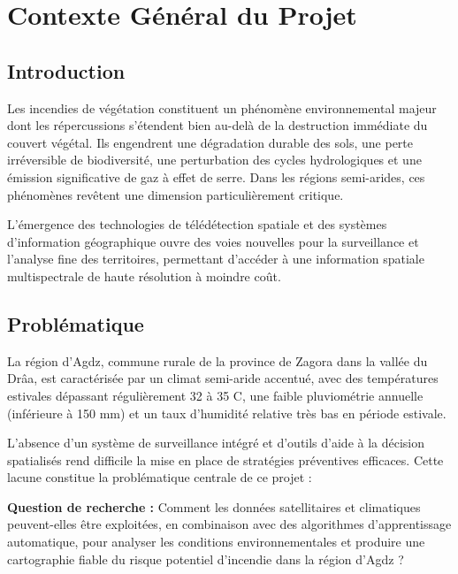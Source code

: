 \documentclass[12pt,a4paper]{report}
\begin{document}
\section{Contexte Général du Projet}

\subsection{Introduction}

Les incendies de végétation constituent un phénomène environnemental majeur dont les répercussions s'étendent bien au-delà de la destruction immédiate du couvert végétal. Ils engendrent une dégradation durable des sols, une perte irréversible de biodiversité, une perturbation des cycles hydrologiques et une émission significative de gaz à effet de serre. Dans les régions semi-arides, ces phénomènes revêtent une dimension particulièrement critique.

L'émergence des technologies de télédétection spatiale et des systèmes d'information géographique ouvre des voies nouvelles pour la surveillance et l'analyse fine des territoires, permettant d'accéder à une information spatiale multispectrale de haute résolution à moindre coût.

\subsection{Problématique}

La région d'Agdz, commune rurale de la province de Zagora dans la vallée du Drâa, est caractérisée par un climat semi-aride accentué, avec des températures estivales dépassant régulièrement 32 à 35\textdegree{} C, une faible pluviométrie annuelle (inférieure à 150 mm) et un taux d'humidité relative très bas en période estivale.

L'absence d'un système de surveillance intégré et d'outils d'aide à la décision spatialisés rend difficile la mise en place de stratégies préventives efficaces. Cette lacune constitue la problématique centrale de ce projet :

\begin{statusbox}
\textbf{Question de recherche :} Comment les données satellitaires et climatiques peuvent-elles être exploitées, en combinaison avec des algorithmes d'apprentissage automatique, pour analyser les conditions environnementales et produire une cartographie fiable du risque potentiel d'incendie dans la région d'Agdz ?
\end{statusbox}
\end{document}
